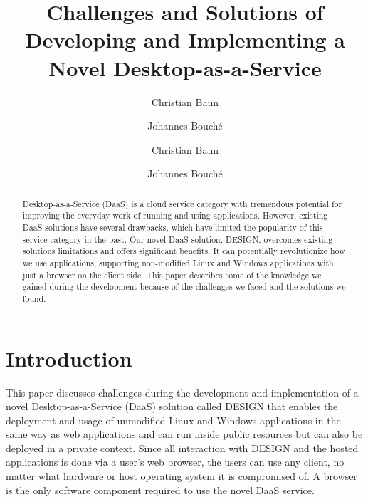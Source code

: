 \documentclass[runningheads]{llncs}
\begin{document}
%
\title{Challenges and Solutions of Developing and
	Implementing a Novel Desktop-as-a-Service}
%
%
\author{Christian Baun \and
	Johannes Bouché}
\author{Christian Baun \and
	Johannes Bouché
}

%
\maketitle              %

\begin{abstract}
	Desktop-as-a-Service (DaaS) is a cloud service category
	with tremendous potential for improving the everyday work
	of running and using applications.
	However, existing DaaS solutions have several drawbacks,
	which have limited the popularity of this service category in the past.
	Our novel DaaS solution, DESIGN, overcomes existing solutions limitations
	and offers significant benefits.
	It can potentially revolutionize how we use applications,
	supporting non-modified Linux and Windows applications
	with just a browser on the client side.
	This paper describes some of the knowledge we gained
	during the development because of the challenges
	we faced and the solutions we found.

\end{abstract}

\section{Introduction}
This paper discusses challenges during the development
and implementation of a novel Desktop-as-a-Service (DaaS) solution
called DESIGN that enables the deployment
and usage of unmodified Linux and Windows applications
in the same way as web applications
and can run inside public resources
but can also be deployed in a private context.
Since all interaction with DESIGN and the hosted applications
is done via a user's web browser,
the users can use any client, no matter what hardware or host operating system
it is compromised of.
A browser is the only software component required to use the novel DaaS service.
\end{document}
